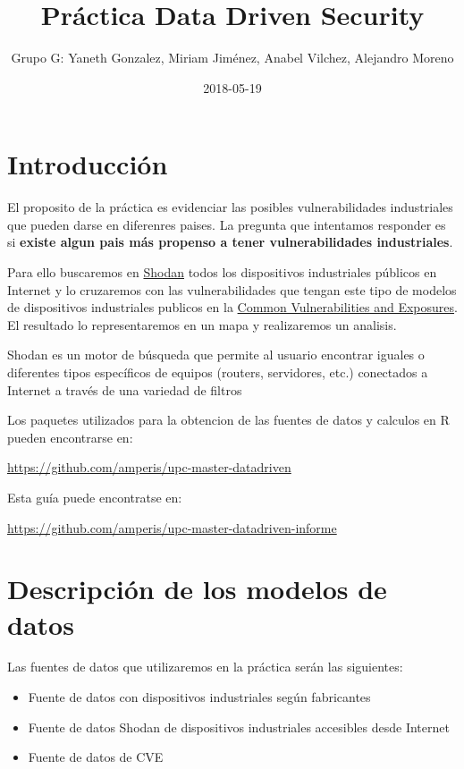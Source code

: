 \documentclass[]{article}
\title{Práctica Data Driven Security}
\author{Grupo G: Yaneth Gonzalez, Miriam Jiménez, Anabel Vilchez, Alejandro
Moreno}
\date{2018-05-19}
\providecommand{\tightlist}{%
  \setlength{\itemsep}{0pt}\setlength{\parskip}{0pt}}
\begin{document}
\maketitle

\section{Introducción}\label{introduccion}

El proposito de la práctica es evidenciar las posibles vulnerabilidades
industriales que pueden darse en diferenres paises. La pregunta que
intentamos responder es si \textbf{existe algun pais más propenso a
tener vulnerabilidades industriales}.

Para ello buscaremos en \href{http://www.shodan.io}{Shodan} todos los
dispositivos industriales públicos en Internet y lo cruzaremos con las
vulnerabilidades que tengan este tipo de modelos de dispositivos
industriales publicos en la \href{https://cve.mitre.org}{Common
Vulnerabilities and Exposures}. El resultado lo representaremos en un
mapa y realizaremos un analisis.

Shodan es un motor de búsqueda que permite al usuario encontrar iguales
o diferentes tipos específicos de equipos (routers, servidores, etc.)
conectados a Internet a través de una variedad de filtros

Los paquetes utilizados para la obtencion de las fuentes de datos y
calculos en R pueden encontrarse en:

\url{https://github.com/amperis/upc-master-datadriven}

Esta guía puede encontratse en:

\url{https://github.com/amperis/upc-master-datadriven-informe}

\section{Descripción de los modelos de
datos}\label{descripcion-de-los-modelos-de-datos}

Las fuentes de datos que utilizaremos en la práctica serán las
siguientes:

\begin{itemize}
\tightlist
\item
  Fuente de datos con dispositivos industriales según fabricantes
\item
  Fuente de datos Shodan de dispositivos industriales accesibles desde
  Internet
\item
  Fuente de datos de CVE
\end{itemize}
\end{document}
